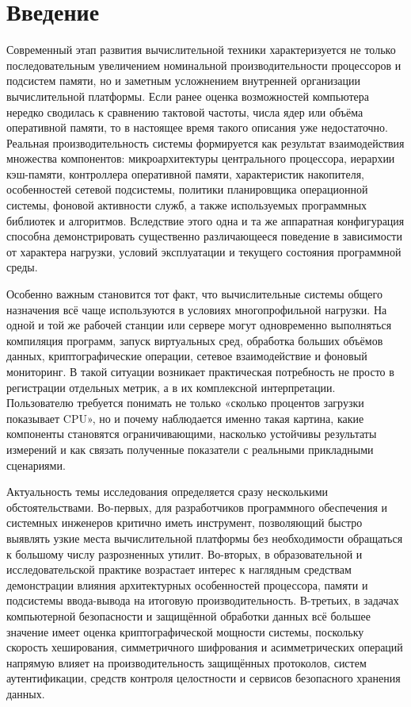\chapter*{Введение}

Современный этап развития вычислительной техники характеризуется не только последовательным увеличением номинальной производительности процессоров и подсистем памяти, но и заметным усложнением внутренней организации вычислительной платформы. Если ранее оценка возможностей компьютера нередко сводилась к сравнению тактовой частоты, числа ядер или объёма оперативной памяти, то в настоящее время такого описания уже недостаточно. Реальная производительность системы формируется как результат взаимодействия множества компонентов: микроархитектуры центрального процессора, иерархии кэш-памяти, контроллера оперативной памяти, характеристик накопителя, особенностей сетевой подсистемы, политики планировщика операционной системы, фоновой активности служб, а также используемых программных библиотек и алгоритмов. Вследствие этого одна и та же аппаратная конфигурация способна демонстрировать существенно различающееся поведение в зависимости от характера нагрузки, условий эксплуатации и текущего состояния программной среды.

Особенно важным становится тот факт, что вычислительные системы общего назначения всё чаще используются в условиях многопрофильной нагрузки. На одной и той же рабочей станции или сервере могут одновременно выполняться компиляция программ, запуск виртуальных сред, обработка больших объёмов данных, криптографические операции, сетевое взаимодействие и фоновый мониторинг. В такой ситуации возникает практическая потребность не просто в регистрации отдельных метрик, а в их комплексной интерпретации. Пользователю требуется понимать не только «сколько процентов загрузки показывает CPU», но и почему наблюдается именно такая картина, какие компоненты становятся ограничивающими, насколько устойчивы результаты измерений и как связать полученные показатели с реальными прикладными сценариями.

Актуальность темы исследования определяется сразу несколькими обстоятельствами. Во-первых, для разработчиков программного обеспечения и системных инженеров критично иметь инструмент, позволяющий быстро выявлять узкие места вычислительной платформы без необходимости обращаться к большому числу разрозненных утилит. Во-вторых, в образовательной и исследовательской практике возрастает интерес к наглядным средствам демонстрации влияния архитектурных особенностей процессора, памяти и подсистемы ввода-вывода на итоговую производительность. В-третьих, в задачах компьютерной безопасности и защищённой обработки данных всё большее значение имеет оценка криптографической мощности системы, поскольку скорость хеширования, симметричного шифрования и асимметрических операций напрямую влияет на производительность защищённых протоколов, систем аутентификации, средств контроля целостности и сервисов безопасного хранения данных.

